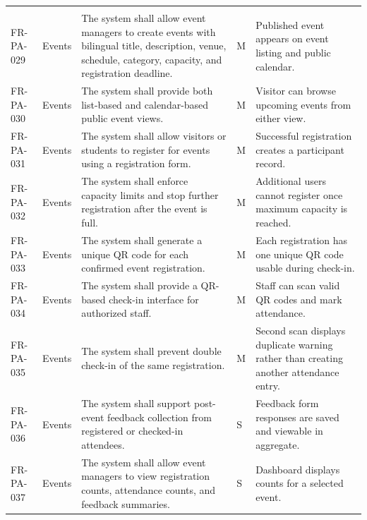 \documentclass[12pt,a4paper]{article}
\begin{document}
\begin{longtable}{@{}L{2cm}L{2.4cm}L{6cm}C{0.9cm}L{3.4cm}@{}}
\\
FR-PA-029 & Events & The system shall allow event managers to create events with bilingual title, description, venue, schedule, category, capacity, and registration deadline. & M & Published event appears on event listing and public calendar. \\
FR-PA-030 & Events & The system shall provide both list-based and calendar-based public event views. & M & Visitor can browse upcoming events from either view. \\
FR-PA-031 & Events & The system shall allow visitors or students to register for events using a registration form. & M & Successful registration creates a participant record. \\
FR-PA-032 & Events & The system shall enforce capacity limits and stop further registration after the event is full. & M & Additional users cannot register once maximum capacity is reached. \\
FR-PA-033 & Events & The system shall generate a unique QR code for each confirmed event registration. & M & Each registration has one unique QR code usable during check-in. \\
FR-PA-034 & Events & The system shall provide a QR-based check-in interface for authorized staff. & M & Staff can scan valid QR codes and mark attendance. \\
FR-PA-035 & Events & The system shall prevent double check-in of the same registration. & M & Second scan displays duplicate warning rather than creating another attendance entry. \\
FR-PA-036 & Events & The system shall support post-event feedback collection from registered or checked-in attendees. & S & Feedback form responses are saved and viewable in aggregate. \\
FR-PA-037 & Events & The system shall allow event managers to view registration counts, attendance counts, and feedback summaries. & S & Dashboard displays counts for a selected event. \\


\end{longtable}
\end{document}
